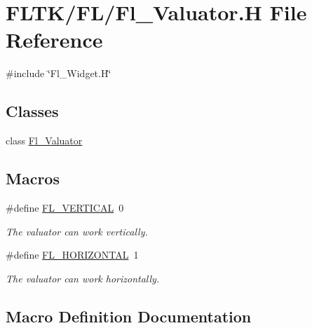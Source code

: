 \hypertarget{_fl___valuator_8_h}{}\section{F\+L\+T\+K/\+F\+L/\+Fl\+\_\+\+Valuator.H File Reference}
\label{_fl___valuator_8_h}
{\ttfamily \#include \char`\"{}Fl\+\_\+\+Widget.\+H\char`\"{}}\newline
\subsection*{Classes}
\begin{DoxyCompactItemize}
\item 
class \hyperlink{class_fl___valuator}{Fl\+\_\+\+Valuator}
\end{DoxyCompactItemize}
\subsection*{Macros}
\begin{DoxyCompactItemize}
\item 
\#define \hyperlink{_fl___valuator_8_h_adf6f91bc725cbe1e3a07b1a5566fce3e}{F\+L\+\_\+\+V\+E\+R\+T\+I\+C\+AL}~0
\begin{DoxyCompactList}\small\item\em The valuator can work vertically. \end{DoxyCompactList}\item 
\#define \hyperlink{_fl___valuator_8_h_a40de8f55ac4cbd5ee8667152db75c668}{F\+L\+\_\+\+H\+O\+R\+I\+Z\+O\+N\+T\+AL}~1
\begin{DoxyCompactList}\small\item\em The valuator can work horizontally. \end{DoxyCompactList}\end{DoxyCompactItemize}


\subsection{Macro Definition Documentation}
\mbox{\label{_fl___valuator_8_h_a40de8f55ac4cbd5ee8667152db75c668}} 
